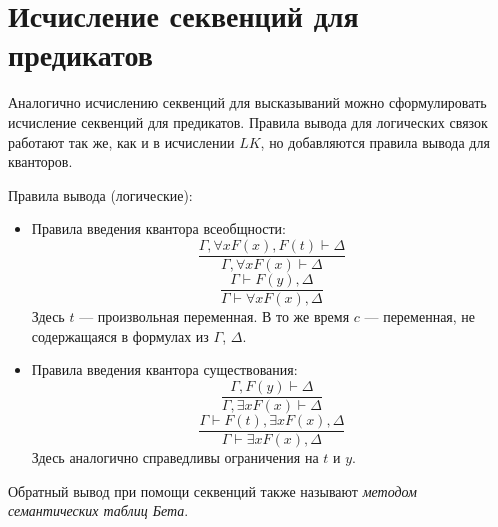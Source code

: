 \section{Исчисление секвенций для предикатов}

Аналогично исчислению секвенций для высказываний можно сформулировать исчисление секвенций для предикатов. Правила вывода для логических связок работают так же, как и в исчислении $LK$, но добавляются правила вывода для кванторов.

Правила вывода (логические):
\begin{itemize}
    \item Правила введения квантора всеобщности:
    \begin{equation*}
        \frac{\Gamma,  \forall x F(x), F(t) \vdash \Delta}{\Gamma, \forall x F(x) \vdash \Delta} \tag{$\forall_L$}
    \end{equation*}
    \begin{equation*}
        \frac{\Gamma \vdash F(y),  \Delta}{\Gamma \vdash \forall x F(x), \Delta} \tag{$\forall_R$}
    \end{equation*}
    Здесь $t$ --- произвольная переменная. В то же время $c$ --- переменная, не содержащаяся в формулах из $\Gamma$, $\Delta$.

    \item Правила введения квантора существования:
    \begin{equation*}
        \frac{\Gamma,  F(y) \vdash \Delta}{\Gamma, \exists x F(x) \vdash \Delta} \tag{$\exists_L$}
    \end{equation*}
    \begin{equation*}
        \frac{\Gamma \vdash F(t), \exists x F(x), \Delta}{\Gamma \vdash \exists x F(x),  \Delta} \tag{$\exists_R$}
    \end{equation*}
    Здесь аналогично справедливы ограничения на $t$ и $y$.
\end{itemize}

\begin{remark}
    Обратный вывод при помощи секвенций также называют \textit{методом семантических таблиц Бета}.
\end{remark}

